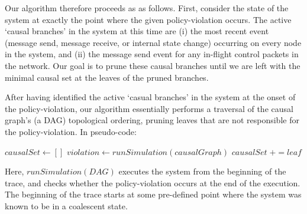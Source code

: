 Our algorithm therefore proceeds as as follows. First, consider
the state of the system at exactly the point where the given policy-violation
occurs. The active `causal branches' in the system at this time are (i) the
most recent event (message send, message receive, or internal state change)
occurring on every node in the system, and (ii) the message send event for any
in-flight control packets in the network. Our goal is to prune these causal
branches until we are left with the minimal causal set at the leaves of the
pruned branches.


After having identified the active `casual branches' in the system at the
onset of the policy-violation, our algorithm essentially performs a
traversal of the causal graph's (a DAG) topological ordering, pruning leaves that are not
responsible for the policy-violation. In pseudo-code:

\begin{algorithmic}
\State $causalSet \gets []$
    \State $violation \gets runSimulation(causalGraph)$
        \State $causalSet\;+= leaf$
    \EndIf
\EndWhile
\end{algorithmic}

Here, $runSimulation(DAG)$ executes the system from the beginning of the
trace, and checks whether the policy-violation occurs at the end of the
execution. The beginning of the trace starts at some pre-defined point where
the system was known to be in a coalescent state.


